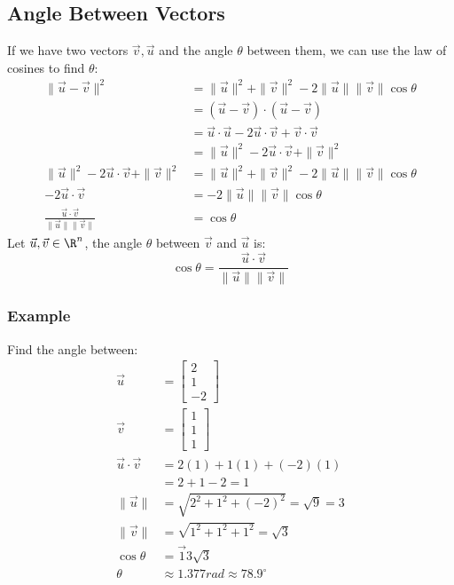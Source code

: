 \documentclass[letterpaper, 12pt]{math}
\begin{document}
\subsection*{Angle Between Vectors}
If we have two vectors \( \vec{v},\vec{u} \) and the angle \( \theta \) between
them, we can use the law of cosines to find \( \theta \):
\begin{align*}
  \|\vec{u}-\vec{v}\|^2 &=
    \|\vec{u}\|^2+\|\vec{v}\|^2-2\|\vec{u}\|\|\vec{v}\|\cos\theta \\
  &= (\vec{u}-\vec{v})\cdot(\vec{u}-\vec{v}) \\
  &= \vec{u}\cdot\vec{u}-2\vec{u}\cdot\vec{v}+\vec{v}\cdot\vec{v} \\
  &= \|\vec{u}\|^2-2\vec{u}\cdot\vec{v}+\|\vec{v}\|^2 \\
  \|\vec{u}\|^2-2\vec{u}\cdot\vec{v}+\|\vec{v}\|^2 &=
    \|\vec{u}\|^2+\|\vec{v}\|^2-2\|\vec{u}\|\|\vec{v}\|\cos\theta \\
  -2\vec{u}\cdot\vec{v} &= -2\|\vec{u}\|\|\vec{v}\|\cos\theta \\
  \frac{\vec{u}\cdot\vec{v}}{\|\vec{u}\|\|\vec{v}\|} &= \cos\theta
\end{align*}
Let \( \vec{u},\vec{v}\in\R^n \), the angle \( \theta \) between \( \vec{v} \)
and \( \vec{u} \) is:
\[ \cos\theta = \frac{\vec{u}\cdot\vec{v}}{\|\vec{u}\|\|\vec{v}\|} \]

\subsubsection*{Example}
Find the angle between:
\begin{align*}
  \vec{u} &= \begin{bmatrix}2 \\ 1 \\ -2\end{bmatrix} \\
  \vec{v} &= \begin{bmatrix}1 \\ 1 \\ 1\end{bmatrix} \\
  \vec{u}\cdot\vec{v} &= 2(1)+1(1)+(-2)(1) \\
  &= 2+1-2 = 1 \\
  \|\vec{u}\| &= \sqrt{2^2+1^2+(-2)^2} = \sqrt{9} = 3 \\
  \|\vec{v}\| &= \sqrt{1^2+1^2+1^2} = \sqrt{3} \\
  \cos\theta &= \vec{1}{3\sqrt{3}} \\
  \theta &\approx 1.377rad \approx 78.9^\circ
\end{align*}
\end{document}
